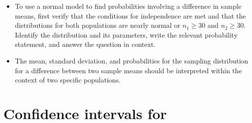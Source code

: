 \begin{itemize}
\item To use a normal model to find probabilities involving a difference in sample means, first verify that the conditions for independence are met and that the distributions for both populations are nearly normal or $n_1\ge 30$ and $n_2\ge 30$.   Identify the distribution and its parameters, write the relevant probability statement, and answer the question in context.

\item The mean, standard deviation, and probabilities for the sampling distribution
for a difference between two sample means should be interpreted
within the context of two specific populations.

\end{itemize}

{}



\section[Confidence intervals for a difference in population means]{Confidence intervals for }
\label{differenceOfTwoMeansCI}%

